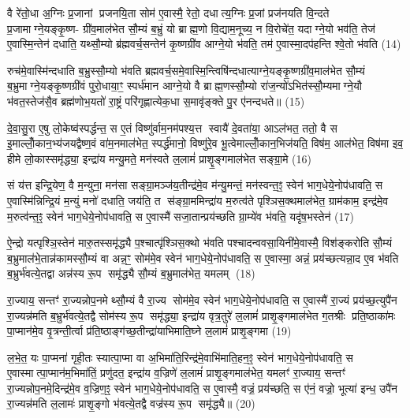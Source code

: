 वै रे॑तो॒धा अ॒ग्निः प्र॒जानां प्रजनयि॒ता सोम॑ ए॒वास्मै॒ रेतो॒ दधात्य॒ग्निः प्र॒जां प्रज॑नयति वि॒न्दते प्र॒जामाग्ने॒यङ्कृ॒ष्ण- ग्री॑व॒माल॑भेत सौ॒म्यं ब॒भ्रुं यो ब्राह्म॒णो वि॒द्याम॒नूच्य॒ न वि॒रोचे॑त॒ यदाग्ने॒यो भव॑ति॒ तेज॑ ए॒वास्मि॒न्तेन॑ दधाति॒ यथ्सौ॒म्यो ब्र॑ह्मवर्च॒सन्तेन॑ कृ॒ष्णग्री॑व आग्ने॒यो भ॑वति॒ तम॑ ए॒वास्मा॒दप॑हन्ति श्वे॒तो भ॑वति (14)

रुच॑मे॒वास्मि॑न्दधाति ब॒भ्रुस्सौ॒म्यो भ॑वति ब्रह्मवर्च॒समे॒वास्मि॒न्त्विषि॑न्दधात्याग्ने॒यङ्कृ॒ष्णग्री॑व॒माल॑भेत सौ॒म्यं ब॒भ्रुमाग्ने॒यङ्कृ॒ष्णग्री॑वं पुरो॒धाया॒ꣳ॒ स्पर्ध॑मान आग्ने॒यो वै ब्राह्म॒णस्सौ॒म्यो रा॑ज॒न्यो॑ऽभित॑स्सौ॒म्यमाग्ने॒यौ भ॑वत॒स्तेज॑सै॒व ब्रह्म॑णोभ॒यतो॑ रा॒ष्ट्रं परि॑गृह्णात्येक॒धा स॒मावृ॑ङ्क्ते पु॒र ए॑नन्दधते॥ (15)

{\anuvakamend[{ल॒भे॒त॒ वरु॑णं व॒शैतामविं॑ व॒शामा॑दि॒त्येभ्यः॒ कामा॑य म॒ल्\mbox{}हा आल॑भेत॒ तान्ये॒व सैवास्मि॒न्थ्सोम॑श्श्वे॒तो भ॑वति॒ त्रिच॑त्वारिशच्च। (2)।}]}

दे॒वा॒सु॒रा ए॒षु लो॒केष्व॑स्पर्द्धन्त॒ स ए॒तं विष्णु॑र्वाम॒नम॑पश्य॒त्त स्वायै॑ दे॒वता॑या॒ आऽल॑भत॒ ततो॒ वै स इ॒माल्लोँ॒कान॒भ्य॑जयद्वैष्ण॒वं वा॑म॒नमाल॑भेत॒ स्पर्द्ध॑मानो॒ विष्णु॑रे॒व भू॒त्वेमाल्लोँ॒कान॒भिज॑यति॒ विष॑म॒ आल॑भेत॒ विष॑मा इव॒ हीमे लो॒कास्समृ॑द्ध्या॒ इन्द्रा॑य मन्यु॒मते॒ मन॑स्वते ल॒लामं॑ प्राशॄ॒ङ्गमाल॑भेत सङ्ग्रा॒मे (16)

सं य॑त्त इन्द्रि॒येण॒ वै म॒न्युना॒ मन॑सा सङ्ग्रा॒मञ्ज॑य॒तीन्द्र॑मे॒व म॑न्यु॒मन्तं॒ मन॑स्वन्त॒ꣵ॒ स्वेन॑ भाग॒धेये॒नोप॑धावति॒ स ए॒वास्मि॑न्निन्द्रि॒यं म॒न्युं मनो॑ दधाति॒ जय॑ति॒ त स॑ङ्ग्रा॒ममिन्द्रा॑य म॒रुत्व॑ते पृश्ञिस॒क्थमाल॑भेत॒ ग्राम॑काम॒ इन्द्र॑मे॒व म॒रुत्व॑न्त॒ꣵ॒ स्वेन॑ भाग॒धेये॒नोप॑धावति॒ स ए॒वास्मै॑ सजा॒तान्प्रय॑च्छति ग्रा॒म्ये॑व भ॑वति॒ यदृ॑ष॒भस्तेन॑ (17)

ऐ॒न्द्रो यत्पृश्ञि॒स्तेन॑ मारु॒तस्समृ॑द्ध्यै प॒श्चात्पृ॑श्ञिस॒क्थो भ॑वति पश्चादन्ववसा॒यिनी॑मे॒वास्मै॒ विश॑ङ्करोति सौ॒म्यं ब॒भ्रुमाल॑भे॒तान्न॑कामस्सौ॒म्यं वा अन्न॒ꣳ॒ सोम॑मे॒व स्वेन॑ भाग॒धेये॒नोप॑धावति॒ स ए॒वास्मा॒ अन्नं॒ प्रय॑च्छत्यन्ना॒द ए॒व भ॑वति ब॒भ्रुर्भ॑वत्ये॒तद्वा अन्न॑स्य रू॒प समृ॑द्ध्यै सौ॒म्यं ब॒भ्रुमाल॑भेत॒ यमलम् (18)

रा॒ज्याय॒ सन्तꣳ॑ रा॒ज्यन्नोप॒नमेथ्सौ॒म्यं वै रा॒ज्य सोम॑मे॒व स्वेन॑ भाग॒धेये॒नोप॑धावति॒ स ए॒वास्मै॑ रा॒ज्यं प्रय॑च्छ॒त्युपै॑न रा॒ज्यन्न॑मति ब॒भ्रुर्भ॑वत्ये॒तद्वै सोम॑स्य रू॒प समृ॑द्ध्या॒ इन्द्रा॑य वृत्र॒तुरे॑ ल॒लामं॑ प्राशृ॒ङ्गमाल॑भेत ग॒तश्रीः प्रति॒ष्ठाका॑मः पा॒प्मान॑मे॒व वृ॒त्रन्ती॒र्त्वा प्र॑ति॒ष्ठाङ्ग॑च्छ॒तीन्द्रा॑याभिमाति॒घ्ने ल॒लामं॑ प्राशृ॒ङ्गमा (19)

ल॒भे॒त॒ यः पा॒प्मना॑ गृही॒तः स्यात्पा॒प्मा वा अ॒भिमा॑ति॒रिन्द्र॑मे॒वाभि॑माति॒हन॒ꣵ॒ स्वेन॑ भाग॒धेये॒नोप॑धावति॒ स ए॒वास्मात्पा॒प्मान॑म॒भिमा॑तिं॒ प्रणु॑दत॒ इन्द्रा॑य व॒ज्रिणे॑ ल॒लामं॑ प्राशृ॒ङ्गमाल॑भेत॒ यमलꣳ॑ रा॒ज्याय॒ सन्तꣳ॑ रा॒ज्यन्नोप॒नमे॒दिन्द्र॑मे॒व व॒ज्रिण॒ꣵ॒ स्वेन॑ भाग॒धेये॒नोप॑धावति॒ स ए॒वास्मै॒ वज्रं॒ प्रय॑च्छति॒ स ए॑नं॒ वज्रो॒ भूत्या॑ इन्ध॒ उपै॑न रा॒ज्यन्न॑मति ल॒लामः॑ प्राशृ॒ङ्गो भ॑वत्ये॒तद्वै वज्र॑स्य रू॒प समृ॑द्ध्यै॥ (20)

